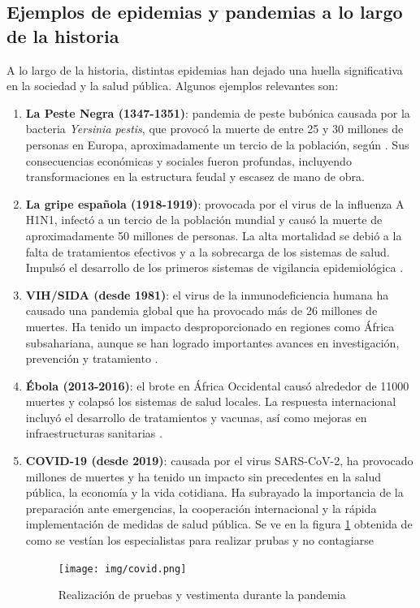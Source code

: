 \subsection{Ejemplos de epidemias y pandemias a lo largo de la historia}
A lo largo de la historia, distintas epidemias han dejado una huella significativa en la sociedad y la salud pública. Algunos ejemplos relevantes son:
\begin{enumerate}
    \item \textbf{La Peste Negra (1347-1351)}: pandemia de peste bubónica causada por la bacteria \textit{Yersinia pestis}, que provocó la muerte de entre 25 y 30 millones de personas en Europa, aproximadamente un tercio de la población, según \cite{patterson2021societal}. Sus consecuencias económicas y sociales fueron profundas, incluyendo transformaciones en la estructura feudal y escasez de mano de obra. 
    
    \item \textbf{La gripe española (1918-1919)}: provocada por el virus de la influenza A H1N1, infectó a un tercio de la población mundial y causó la muerte de aproximadamente 50 millones de personas. La alta mortalidad se debió a la falta de tratamientos efectivos y a la sobrecarga de los sistemas de salud. Impulsó el desarrollo de los primeros sistemas de vigilancia epidemiológica \cite{kilbourne2006influenza}.
    
  
    \item \textbf{VIH/SIDA (desde 1981)}: el virus de la inmunodeficiencia humana ha causado una pandemia global que ha provocado más de 26 millones de muertes. Ha tenido un impacto desproporcionado en regiones como África subsahariana, aunque se han logrado importantes avances en investigación, prevención y tratamiento \cite{miranda2022tale}.
    \item \textbf{Ébola (2013-2016)}: el brote en África Occidental causó alrededor de 11000 muertes y colapsó los sistemas de salud locales. La respuesta internacional incluyó el desarrollo de tratamientos y vacunas, así como mejoras en infraestructuras sanitarias \cite{who2014ebola}.
    \item \textbf{COVID-19 (desde 2019)}: causada por el virus SARS-CoV-2, ha provocado millones de muertes y ha tenido un impacto sin precedentes en la salud pública, la economía y la vida cotidiana. Ha subrayado la importancia de la preparación ante emergencias, la cooperación internacional y la rápida implementación de medidas de salud pública. Se ve en la figura \ref{fig:covid} obtenida de \cite{bbc2020corea} como se vestían los especialistas para realizar prubas y no contagiarse
    
    \begin{figure}[H]
        \centering
        \texttt{[image: img/covid.png]}
        \caption{Realización de pruebas y vestimenta durante la pandemia}
        \label{fig:covid}
        \vspace{0.5cm} %
    \end{figure}
\end{enumerate}

